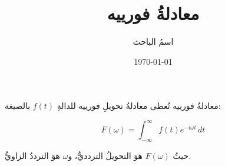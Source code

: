 \documentclass{beamer}
\title{معادلةُ فورييه}
\author{اسمُ الباحث}
\institute{الجامعة}
\date{\today}
\begin{document}
\begin{frame}{معادلةُ فورييه}
  تُعطى معادلةُ تحويلِ فورييه
  للدالةِ $f(t)$ بالصيغة:

  \begin{equation}
    F(\omega) = \int_{-\infty}^{\infty}
    f(t) e^{-i\omega t} \, dt
  \end{equation}

  حيثُ $F(\omega)$ هوَ التحويلُ
  التردديُّ، و$\omega$ هوَ الترددُ
  الزاويُّ.
\end{frame}
\end{document}
